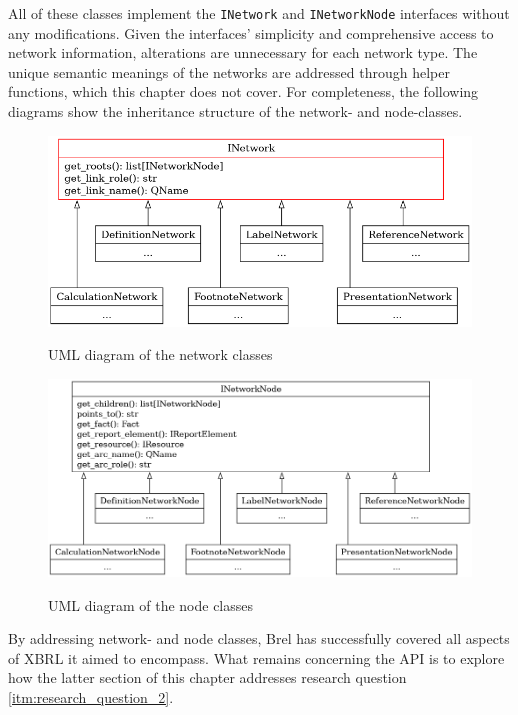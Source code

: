All of these classes implement the \texttt{INetwork} and \texttt{INetworkNode} interfaces without any modifications.
Given the interfaces' simplicity and comprehensive access to network information,
alterations are unnecessary for each network type.
The unique semantic meanings of the networks are addressed through helper functions, which this chapter does not cover.
For completeness, the following diagrams show the inheritance structure of the network- and node-classes.

\begin{figure}[H]
    \centering
    \caption{UML diagram of the network classes}
    \includegraphics[width=\textwidth]{images/brel_network_classes.png}
    \label{fig:brel_network_classes}
\end{figure}

\begin{figure}[H]
    \centering
    \caption{UML diagram of the node classes}
    \includegraphics[width=\textwidth]{images/brel_network_node_classes.png}
    \label{fig:brel_network_node_classes}
\end{figure}

By addressing network- and node classes, Brel has successfully covered all aspects of XBRL it aimed to encompass.
What remains concerning the API is to explore how the latter section of this chapter addresses research question \ref{itm:research_question_2}.
